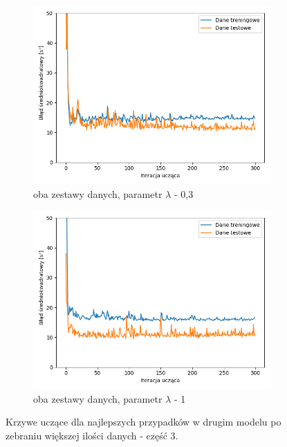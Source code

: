 \documentclass[12pt]{aghdpl}
\begin{document}
		\begin{figure}[h]
			\centering
		 	\begin{subfigure}{.8\linewidth}
		 		\includegraphics[width =\linewidth]{wykresy/8_zebranie_wiekszej_ilosci_danych/0-400/regularyzacja_0_3_wykres_uczenia.png}
		 		\caption{oba zestawy danych, parametr $\lambda$ - 0,3}
		 	\end{subfigure}
		 	\begin{subfigure}{.8\linewidth}
		 		\includegraphics[width =\linewidth]{wykresy/8_zebranie_wiekszej_ilosci_danych/0-400/regularyzacja_1_wykres_uczenia.png}
		 		\caption{oba zestawy danych, parametr $\lambda$ - 1}
		 	\end{subfigure}
	 	
 			\caption{Krzywe uczące dla najlepszych przypadków w drugim modelu po zebraniu większej ilości danych - część 3.}
			\label{fig: drugi_model_po_zebraniu_wiekszej_ilosci_danych_wykresy_uczenia_3}
		\end{figure}
		
\end{document}
